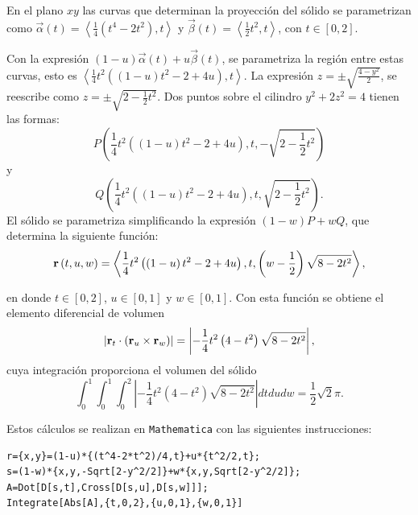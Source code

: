 En el plano $xy$ las curvas que determinan la proyección del sólido se parametrizan como {\small $\overrightarrow{\alpha }(t)=\left\langle \frac{1}{4}\left(
t^{4}-2t^2\right) ,t\right\rangle$} y {\small $\overrightarrow{\beta }(t)=\left\langle \frac{1}{2}t^2,t\right\rangle$}, con $t\in [0,2]$.

Con la expresión {\small $\left( 1-u\right) \overrightarrow{\alpha }(t)+u\overrightarrow{\beta }(t)$},
se parametriza la región entre estas curvas, esto es {\small $\left\langle \frac{1}{4}t^2\left( \left(1-u\right)t^2-2+4u\right) ,t\right\rangle$}.
La expresión {\small $z=\pm \sqrt{\frac{4-y^2}{2}}$,} se reescribe como {\small $z=\pm \sqrt{2-\frac{1}{2}t^2}$}.
Dos puntos sobre el cilindro $y^2+2z^2=4$ tienen las formas:
\[P\left( \frac{1}{4}t^2\left( \left( 1-u\right) t^2-2+4u\right) ,t,-\sqrt{2-\frac{1}{2}t^2}\right)\]
y \[Q\left( \frac{1}{4}t^2\left( \left(1-u\right) t^2-2+4u\right) ,t,\sqrt{2-\frac{1}{2}t^2}\right).\]
El sólido se parametriza simplificando la expresión $(1-w)P+wQ$, que determina la siguiente función:
\begin{equation*}
{\bf r}\left( t,u,w\right) = \left\langle \frac{1}{4}t^2\left( \left( 1-u\right)
t^2-2+4u\right) ,t,\left( w-\frac{1}{2}\right) \sqrt{8-2t^2}\right\rangle,
\end{equation*}

en donde $t\in [0,2]$, $u\in [0,1]$ y $w\in [0,1]$. %
Con esta función se obtiene el elemento diferencial de volumen
\[\left| {\bf r}_{t}\cdot \left({\bf r}_{u}\times {\bf r}_{w}\right) \right| =\left| -\frac{1}{4}t^2\left( 4-t^2\right) \sqrt{8-2t^2}\right|,\]
cuya integración proporciona el volumen del sólido
\[\int_{0}^{1}\int_{0}^{1}\int_{0}^2\left| -\frac{1}{4}t^2\left( 4-t^2\right) \sqrt{8-2t^2}\right|dtdudw= \frac{1}{2}\sqrt{2}\pi.\]

Estos cálculos se realizan en \verb"Mathematica" con las siguientes instrucciones:

\begin{tcolorbox}[title=\bf Instrucción en \verb"Mathematica"]\begin{Verbatim}[formatcom=\letraverbatim]
r={x,y}=(1-u)*{(t^4-2*t^2)/4,t}+u*{t^2/2,t};
s=(1-w)*{x,y,-Sqrt[2-y^2/2]}+w*{x,y,Sqrt[2-y^2/2]};
A=Dot[D[s,t],Cross[D[s,u],D[s,w]]];
Integrate[Abs[A],{t,0,2},{u,0,1},{w,0,1}]
\end{Verbatim}
\end{tcolorbox}

